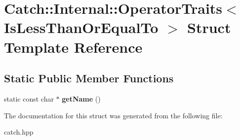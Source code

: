 \hypertarget{structCatch_1_1Internal_1_1OperatorTraits_3_01IsLessThanOrEqualTo_01_4}{}\section{Catch\+:\+:Internal\+:\+:Operator\+Traits$<$ Is\+Less\+Than\+Or\+Equal\+To $>$ Struct Template Reference}
\label{structCatch_1_1Internal_1_1OperatorTraits_3_01IsLessThanOrEqualTo_01_4}
\subsection*{Static Public Member Functions}
\begin{DoxyCompactItemize}
\item 
static const char $\ast$ {\bfseries get\+Name} ()\hypertarget{structCatch_1_1Internal_1_1OperatorTraits_3_01IsLessThanOrEqualTo_01_4_ae8578813bc847838f10448c1541a9d7b}{}\label{structCatch_1_1Internal_1_1OperatorTraits_3_01IsLessThanOrEqualTo_01_4_ae8578813bc847838f10448c1541a9d7b}

\end{DoxyCompactItemize}


The documentation for this struct was generated from the following file\+:\begin{DoxyCompactItemize}
\item 
catch.\+hpp\end{DoxyCompactItemize}
